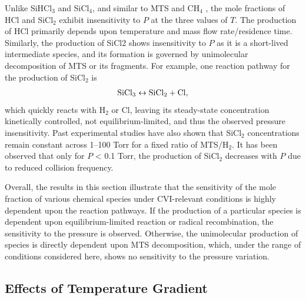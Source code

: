 \documentclass[final, letterpaper, square, comma, numbers, sort&compress]{elsarticle}
\begin{document}
Unlike SiHCl$_3$ and SiCl$_4$, and similar to MTS and CH$_4$ , the mole fractions of HCl and SiCl$_2$ exhibit insensitivity to $P$ at the three values of $T$. The production of HCl primarily depends upon temperature and mass flow rate/residence time. Similarly, the production of SiCl2 shows insensitivity to $P$ as it is a short-lived intermediate species, and its formation is governed by unimolecular decomposition of MTS or its fragments. For example, one reaction pathway for the production of SiCl$_2$ is
\begin{align*}
    \rm SiCl_3 \leftrightarrow SiCl_2 + Cl,
\end{align*}
which quickly reacts with H$_2$ or Cl, leaving its steady-state concentration kinetically controlled, not equilibrium-limited, and thus the observed pressure insensitivity. Past experimental studies have also shown that SiCl$_2$ concentrations remain constant across 1–100 Torr for a fixed ratio of MTS/H$_2$. It has been observed that only for $P$ < 0.1 Torr, the production of SiCl$_2$ decreases with $P$ due to reduced collision frequency.

Overall, the results in this section illustrate that the sensitivity of the mole fraction of various chemical species under CVI-relevant conditions is highly dependent upon the reaction pathways. If the production of a particular species is dependent upon equilibrium-limited reaction or radical recombination, the sensitivity to the pressure is observed. Otherwise, the unimolecular production of species is directly dependent upon MTS decomposition, which, under the range of conditions considered here, shows no sensitivity to the pressure
variation.

\subsection{Effects of Temperature Gradient}
\end{document}
